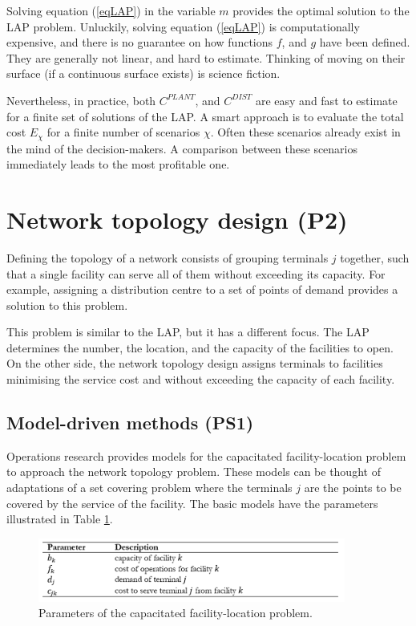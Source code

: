 Solving equation (\ref{eqLAP}) in the variable $m$ provides the optimal solution to the LAP problem. Unluckily, solving equation (\ref{eqLAP}) is computationally expensive, and there is no guarantee on how functions $f$, and $g$ have been defined. They are generally not linear, and hard to estimate. Thinking of moving on their surface (if a continuous surface exists) is science fiction.\par

Nevertheless, in practice, both $C^{PLANT}$, and $C^{DIST}$ are easy and fast to estimate for a finite set of solutions of the LAP. A smart approach is to evaluate the total cost $E_\chi$ for a finite number of scenarios $\chi$. Often these scenarios already exist in the mind of the decision-makers. A comparison between these scenarios immediately leads to the most profitable one.

\section{Network topology design (P2)}
Defining the topology of a network consists of grouping terminals $j$ together, such that a single facility can serve all of them without exceeding its capacity. For example, assigning a distribution centre to a set of points of demand provides a solution to this problem.\par

This problem is similar to the LAP, but it has a different focus. The LAP determines the number, the location, and the capacity of the facilities to open. On the other side, the network topology design assigns terminals to facilities minimising the service cost and without exceeding the capacity of each facility. 

\subsection{Model-driven methods (PS1)}

Operations research provides models for the capacitated facility-location problem to approach the network topology problem. These models can be thought of adaptations of a set covering problem where the terminals $j$ are the points to be covered by the service of the facility. The basic models have the parameters illustrated in Table \ref{tab_routeTopology}.


\begin{figure}[hbt!]
\centering
\includegraphics[width=0.9\textwidth]{SectionDistribution/design_figures/tab_routeTopology.png}
\captionsetup{type=table}
\caption{Parameters of the capacitated facility-location problem.}
\label{tab_routeTopology}
\end{figure}


